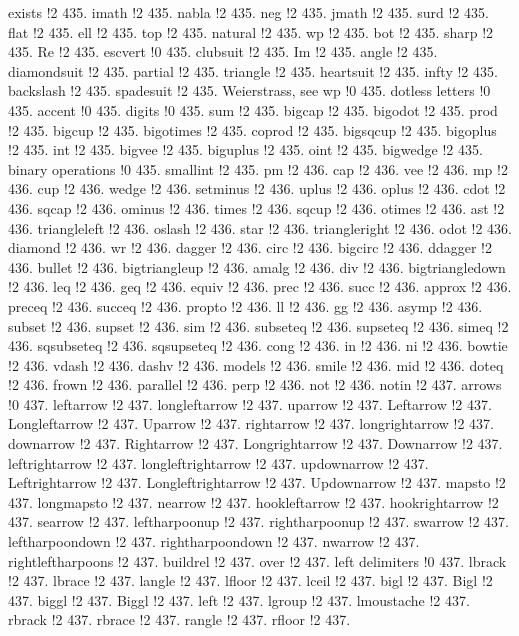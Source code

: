 exists !2 435.
imath !2 435.
nabla !2 435.
neg !2 435.
jmath !2 435.
surd !2 435.
flat !2 435.
ell !2 435.
top !2 435.
natural !2 435.
wp !2 435.
bot !2 435.
sharp !2 435.
Re !2 435.
escvert !0 435.
clubsuit !2 435.
Im !2 435.
angle !2 435.
diamondsuit !2 435.
partial !2 435.
triangle !2 435.
heartsuit !2 435.
infty !2 435.
backslash !2 435.
spadesuit !2 435.
Weierstrass, see wp !0 435.
dotless letters !0 435.
accent !0 435.
digits !0 435.
sum !2 435.
bigcap !2 435.
bigodot !2 435.
prod !2 435.
bigcup !2 435.
bigotimes !2 435.
coprod !2 435.
bigsqcup !2 435.
bigoplus !2 435.
int !2 435.
bigvee !2 435.
biguplus !2 435.
oint !2 435.
bigwedge !2 435.
binary operations !0 435.
smallint !2 435.
pm !2 436.
cap !2 436.
vee !2 436.
mp !2 436.
cup !2 436.
wedge !2 436.
setminus !2 436.
uplus !2 436.
oplus !2 436.
cdot !2 436.
sqcap !2 436.
ominus !2 436.
times !2 436.
sqcup !2 436.
otimes !2 436.
ast !2 436.
triangleleft !2 436.
oslash !2 436.
star !2 436.
triangleright !2 436.
odot !2 436.
diamond !2 436.
wr !2 436.
dagger !2 436.
circ !2 436.
bigcirc !2 436.
ddagger !2 436.
bullet !2 436.
bigtriangleup !2 436.
amalg !2 436.
div !2 436.
bigtriangledown !2 436.
leq !2 436.
geq !2 436.
equiv !2 436.
prec !2 436.
succ !2 436.
approx !2 436.
preceq !2 436.
succeq !2 436.
propto !2 436.
ll !2 436.
gg !2 436.
asymp !2 436.
subset !2 436.
supset !2 436.
sim !2 436.
subseteq !2 436.
supseteq !2 436.
simeq !2 436.
sqsubseteq !2 436.
sqsupseteq !2 436.
cong !2 436.
in !2 436.
ni !2 436.
bowtie !2 436.
vdash !2 436.
dashv !2 436.
models !2 436.
smile !2 436.
mid !2 436.
doteq !2 436.
frown !2 436.
parallel !2 436.
perp !2 436.
not !2 436.
notin !2 437.
arrows !0 437.
leftarrow !2 437.
longleftarrow !2 437.
uparrow !2 437.
Leftarrow !2 437.
Longleftarrow !2 437.
Uparrow !2 437.
rightarrow !2 437.
longrightarrow !2 437.
downarrow !2 437.
Rightarrow !2 437.
Longrightarrow !2 437.
Downarrow !2 437.
leftrightarrow !2 437.
longleftrightarrow !2 437.
updownarrow !2 437.
Leftrightarrow !2 437.
Longleftrightarrow !2 437.
Updownarrow !2 437.
mapsto !2 437.
longmapsto !2 437.
nearrow !2 437.
hookleftarrow !2 437.
hookrightarrow !2 437.
searrow !2 437.
leftharpoonup !2 437.
rightharpoonup !2 437.
swarrow !2 437.
leftharpoondown !2 437.
rightharpoondown !2 437.
nwarrow !2 437.
rightleftharpoons !2 437.
buildrel !2 437.
over !2 437.
left delimiters !0 437.
lbrack !2 437.
lbrace !2 437.
langle !2 437.
lfloor !2 437.
lceil !2 437.
bigl !2 437.
Bigl !2 437.
biggl !2 437.
Biggl !2 437.
left !2 437.
lgroup !2 437.
lmoustache !2 437.
rbrack !2 437.
rbrace !2 437.
rangle !2 437.
rfloor !2 437.
